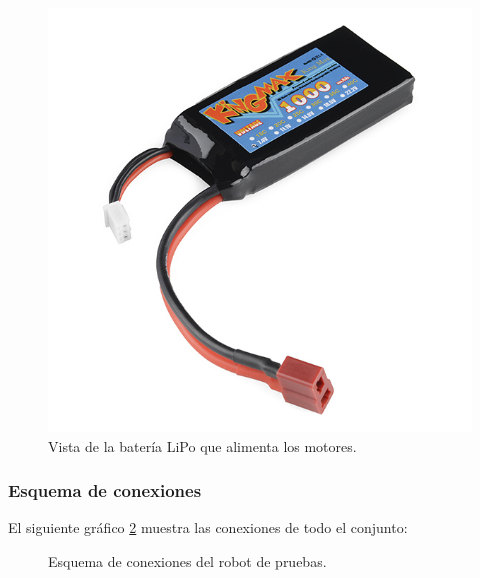 \begin{figure}[H]
  \begin{center}
    \includegraphics[scale=0.4]{imagenes/robot/bateria-lipo.jpg}
  \end{center}
  \caption{Vista de la batería LiPo que alimenta los motores.}
  \label{figura:rpi-modulo-bateria}
\end{figure}



\subsubsection{Esquema de conexiones}

El siguiente gráfico \ref{diagrama:esquema-conexiones} muestra las conexiones de todo el conjunto:

\begin{figure}[H]
  \caption{Esquema de conexiones del robot de pruebas.}
  \label{diagrama:esquema-conexiones}
\end{figure}


